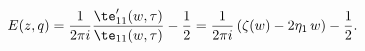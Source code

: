 \begin{equation}
E(z,q)=\frac{1}{2\pi i}
\frac{\te'_{11}(w,\tau)}{\te_{11}(w,\tau)}-\frac12
=\frac{1}{2\pi i}\left(\zeta(w)-2\eta_1\,w\right)-\frac12.
\label{E}
\end{equation}

